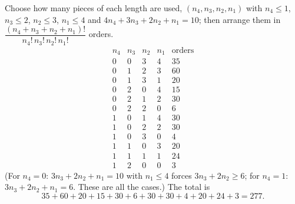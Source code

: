 Choose how many pieces of each length are used, $(n_4,n_3,n_2,n_1)$ with $n_4\le1$, $n_3\le2$, $n_2\le3$, $n_1\le4$ and $4n_4+3n_3+2n_2+n_1=10$; then arrange them in $\dfrac{(n_4+n_3+n_2+n_1)!}{n_4!\,n_3!\,n_2!\,n_1!}$ orders.
\[
\begin{array}{cccc|c}
n_4&n_3&n_2&n_1&\text{orders}\\\hline
0&0&3&4&35\\
0&1&2&3&60\\
0&1&3&1&20\\
0&2&0&4&15\\
0&2&1&2&30\\
0&2&2&0&6\\
1&0&1&4&30\\
1&0&2&2&30\\
1&0&3&0&4\\
1&1&0&3&20\\
1&1&1&1&24\\
1&2&0&0&3
\end{array}
\]
(For $n_4=0$: $3n_3+2n_2+n_1=10$ with $n_1\le4$ forces $3n_3+2n_2\ge6$; for $n_4=1$: $3n_3+2n_2+n_1=6$. These are all the cases.) The total is
\[
35+60+20+15+30+6+30+30+4+20+24+3=\boxed{277}.
\]
